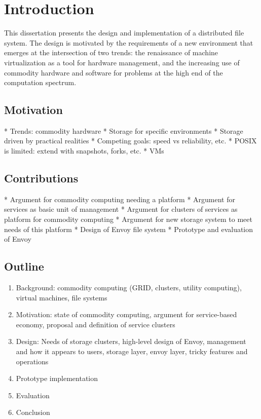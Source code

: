 \chapter{Introduction}

This dissertation presents the design and implementation of a distributed file system. The design is motivated by the requirements of a new environment that emerges at the intersection of two trends: the renaissance of machine virtualization as a tool for hardware management, and the increasing use of commodity hardware and software for problems at the high end of the computation spectrum. 

\section{Motivation}

* Trends: commodity hardware 
* Storage for specific environments
* Storage driven by practical realities
* Competing goals: speed vs reliability, etc.
* POSIX is limited: extend with snapshots, forks, etc.
* VMs

\section{Contributions}

* Argument for commodity computing needing a platform
* Argument for services as basic unit of management
* Argument for clusters of services as platform for commodity computing
* Argument for new storage system to meet needs of this platform
* Design of Envoy file system
* Prototype and evaluation of Envoy

\section{Outline}
\begin{enumerate}
\item Background: commodity computing (GRID, clusters, utility computing), virtual machines, file systems
\item Motivation: state of commodity computing, argument for service-based economy, proposal and definition of service clusters
\item Design: Needs of storage clusters, high-level design of Envoy, management and how it appears to users, storage layer, envoy layer, tricky features and operations
\item Prototype implementation
\item Evaluation
\item Conclusion
\end{enumerate}
